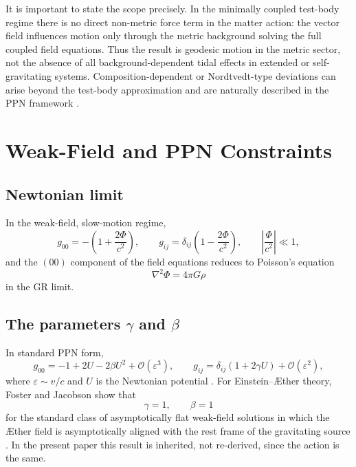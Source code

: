 \documentclass[12pt,a4paper]{article}
\newcommand{\AEther}{\AE{}ther}
\begin{document}
        It is important to state the scope precisely. In the minimally coupled
        test-body regime there is no direct non-metric force term in the matter action:
        the vector field influences motion only through the metric background solving the
        full coupled field equations. Thus the result is geodesic motion in the metric
        sector, not the absence of all background-dependent tidal effects in extended or
        self-gravitating systems. Composition-dependent or Nordtvedt-type deviations can
        arise beyond the test-body approximation and are naturally described in the PPN
        framework \cite{foster2006,will2014}.
    
    \section{Weak-Field and PPN Constraints}
        \label{sec:obs}
        
        \subsection{Newtonian limit}
            
            In the weak-field, slow-motion regime,
            \begin{equation}
                g_{00} = -\left(1+\frac{2\Phi}{c^2}\right),
                \qquad
                g_{ij} = \delta_{ij}\left(1-\frac{2\Phi}{c^2}\right),
                \qquad
                \left|\frac{\Phi}{c^2}\right|\ll 1,
            \end{equation}
            and the $(00)$ component of the field equations reduces to Poisson's equation
            \begin{equation}
                \nabla^2 \Phi = 4\pi G \rho
            \end{equation}
            in the GR limit.
        
        
            \subsection{\texorpdfstring{The parameters $\gamma$ and $\beta$}{The parameters gamma and beta}}

            
            In standard PPN form,
            \begin{equation}
             g_{00} = -1 + 2U - 2\beta U^2 + \mathcal O(\varepsilon^3),
             \qquad
             g_{ij} = \delta_{ij}(1+2\gamma U) + \mathcal O(\varepsilon^2),
            \end{equation}
            where $\varepsilon\sim v/c$ and $U$ is the Newtonian potential
            \cite{will1993,will2014}. For Einstein--\AEther{} theory, Foster and Jacobson
            show that
            \begin{equation}
             \gamma=1,\qquad \beta=1
            \end{equation}
            for the standard class of asymptotically flat weak-field solutions in which the
            \AEther{} field is asymptotically aligned with the rest frame of the gravitating
            source \cite{foster2006}. In the present paper this result is inherited, not
            re-derived, since the action is the same.
\end{document}

